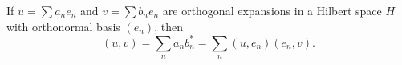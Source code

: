 If $u = \sum a_n e_n$ and $v = \sum b_n e_n$ are orthogonal expansions in a Hilbert space $H$ with orthonormal basis $(e_n)$, then
$$(u, v) = \sum_{n} a_n b_n^* = \sum_{n} (u, e_n)(e_n, v).$$

